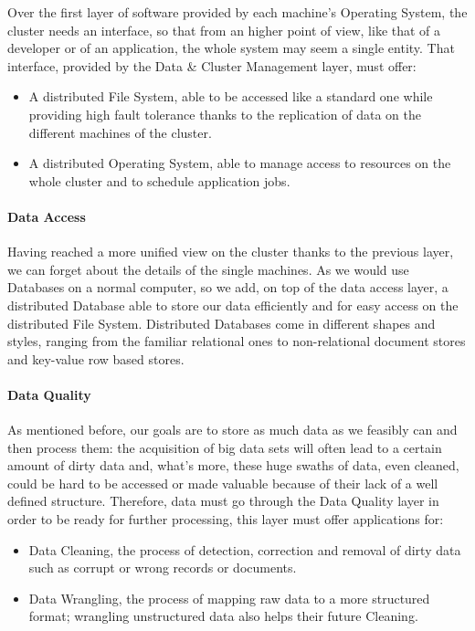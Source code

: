 Over the first layer of software provided by each machine's Operating System, the cluster needs an interface, so that from an higher point of view, like that of a developer or of an application, the whole system may seem a single entity. \newline
That interface, provided by the Data \& Cluster Management layer, must offer: 
\begin{itemize}
	\item A distributed File System, able to be accessed like a standard one while providing high fault tolerance thanks to the replication of data on the different machines of the cluster.
	\item A distributed Operating System, able to manage access to resources on the whole cluster and to schedule application jobs.
\end{itemize}

\paragraph{Data Access}

Having reached a more unified view on the cluster thanks to the previous layer, we can forget about the details of the single machines.\newline
As we would use Databases on a normal computer, so we add, on top of the data access layer, a distributed Database able to store our data efficiently and for easy access on the distributed File System.
Distributed Databases come in different shapes and styles, ranging from the familiar relational ones to non-relational document stores and key-value row based stores.

\paragraph{Data Quality}

As mentioned before, our goals are to store as much data as we feasibly can and then process them: the acquisition of big data sets will often lead to a certain amount of dirty data and, what’s more, these huge swaths of data, even cleaned, could be hard to be accessed or made valuable because of their lack of a well defined structure.
\newline
Therefore, data must go through the Data Quality layer in order to be ready for further processing, this layer must offer applications for:
\begin{itemize}
	\item Data Cleaning, the process of detection, correction and removal of dirty data such as corrupt or wrong records or documents.
	\item Data Wrangling, the process of mapping raw data to a more structured format; wrangling unstructured data also helps their future Cleaning.
\end{itemize}

